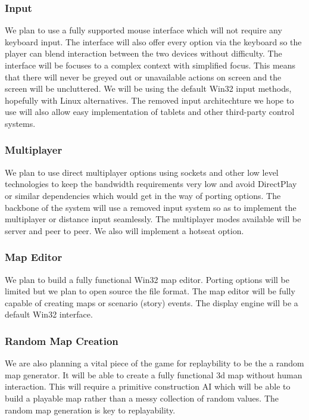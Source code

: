 \documentclass[a4paper]{article}
\begin{document}
\subsubsection{Input}

We plan to use a fully supported mouse interface which will not require any keyboard input. The interface will also offer every option via the keyboard so the player can blend interaction between the two devices without difficulty. The interface will be focuses to a complex context with simplified focus. This means that there will never be greyed out or unavailable actions on screen and the screen will be uncluttered. We will be using the default Win32 input methods, hopefully with Linux alternatives. The removed input architechture we hope to use will also allow easy implementation of tablets and other third-party control systems.

\subsubsection{Multiplayer}

We plan to use direct multiplayer options using sockets and other low level technologies to keep the bandwidth requirements very low and avoid DirectPlay or similar dependencies which would get in the way of porting options. The backbone of the system will use a removed input system so as to implement the multiplayer or distance input seamlessly. The multiplayer modes available will be server and peer to peer. We also will implement a hotseat option.

\subsubsection{Map Editor}

We plan to build a fully functional Win32 map editor. Porting options will be limited but we plan to open source the file format. The map editor will be fully capable of creating maps or scenario (story) events. The display engine will be a default Win32 interface.

\subsubsection{Random Map Creation}

We are also planning a vital piece of the game for replaybility to be the a random map generator. It will be able to create a fully functional 3d map without human interaction. This will require a primitive construction AI which will be able to build a playable map rather than a messy collection of random values. The random map generation is key to replayability.
\end{document}
